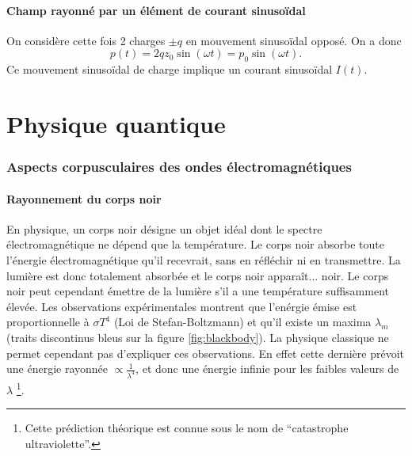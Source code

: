 \subsection{Champ rayonné par un élément de courant sinusoïdal}
On considère cette fois 2 charges $\pm q$ en mouvement
sinusoïdal opposé. On a donc
\[ p(t) = 2qz_0\sin(\omega t) = p_0\sin(\omega t).\]
Ce mouvement sinusoïdal de charge implique un courant
sinusoïdal $I(t)$.


\part{Physique quantique}
\section{Aspects corpusculaires des ondes électromagnétiques}
\subsection{Rayonnement du corps noir}
En physique, un corps noir désigne un objet idéal dont
le spectre électromagnétique ne dépend que la température.
Le corps noir absorbe toute l'énergie électromagnétique
qu'il recevrait, sans en réfléchir ni en transmettre.
La lumière est donc totalement absorbée et le corps noir
apparaît... noir. Le corps noir peut cependant
émettre de la lumière s'il a une température
suffisamment élevée. Les observations expérimentales
montrent que l'enérgie émise est proportionnelle à $\sigma T^4$
(Loi de Stefan-Boltzmann) et qu'il existe un maxima $\lambda_m$
(traits discontinus bleus sur la figure \ref{fig:blackbody}).
La physique classique ne permet cependant pas d'expliquer
ces observations. En effet cette dernière prévoit une
énergie rayonnée $\propto \frac{1}{\lambda^4}$, et donc
une énergie infinie pour les faibles valeurs de $\lambda$
\footnote{Cette prédiction théorique est connue sous le nom
de ``catastrophe ultraviolette''.}.

